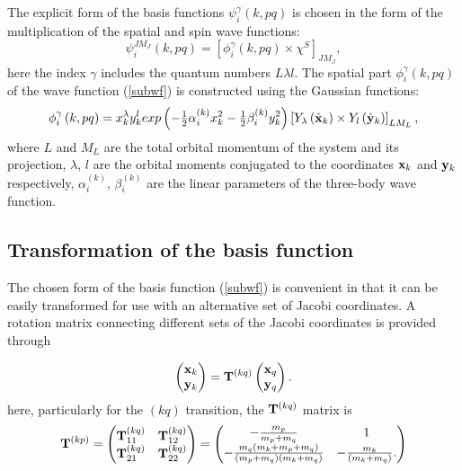 \documentclass[12pt,a4paper,twoside]{article}
\begin{document}
The explicit form of the basis functions $ \psi_{i}^{\gamma} \left(k, pq \right) $ is chosen in the form of the multiplication of the spatial and spin wave functions:
\begin{equation}
\psi_{i}^{JM_J}\left(k, pq \right) = \left[ \phi_{i}^{\gamma} \left(k, pq \right) 
\times \chi^{S} \right] _{JM_{J}},
\label{subwf}
\end{equation}
here the index $\gamma$ includes the quantum numbers $L \lambda l$. The spatial part $\phi_{i}^{\gamma} \left(k, pq \right) $ of the wave function (\ref {subwf}) is constructed using the Gaussian functions:
 \begin{equation}
 \phi_{i}^{\gamma} \left(k, pq \right) =
 x_{k}^{\lambda} y_{k}^{l} exp\left(- \tfrac{1}{2}\alpha^{(k)}_{i} x_{k}^{2} - \tfrac{1}{2} \beta^{(k)}_{i}  y_{k}^{2} \right) 
 \left[ Y_\lambda \left(  \hat{ \bf x}_k \right) \times Y_l \left( \hat{\bf y}_k \right) \right]_{LM_L},
 \label{radial_wf}
 \end{equation}
where $ L $ and $ M_L $ are the total orbital momentum of the system and its projection, $ \lambda $, $ l $ are the orbital moments conjugated to the coordinates $ {\bf x} _k $ and $ {\bf y} _k $ respectively, $ \alpha^{(k)} _ {i} $, $ \beta^{(k)}_{i}$ are the linear parameters of the three-body wave function.
 \subsection{Transformation of the basis function }
 The chosen form of the basis function (\ref{subwf}) is convenient in that it can be easily transformed for use with an alternative set of Jacobi coordinates. A rotation matrix connecting different sets of the Jacobi coordinates is provided through
 
\begin{equation}
\begin{pmatrix}
{\bf x}_k \\ 
{\bf y}_k
\end{pmatrix}  = {\bf T}^{(kq)}
\begin{pmatrix}
{\bf x}_q \\ 
{\bf y}_q
\end{pmatrix}.
\end{equation}
here, particularly for  the $(kq)$ transition, the ${\bf T}^{(kq)}$ matrix is 
\begin{equation}
{\bf T}^{(kp)} = 
 \begin{pmatrix}
 {\bf T}^{(kq)}_{11} & {\bf T}^{(kq)}_{12} \\
 {\bf T}^{(kq)}_{21}  &  {\bf T}^{(kq)}_{22}
 \end{pmatrix}
=
 \begin{pmatrix}
 -\tfrac{m_p}{m_p+m_q} & 1 \\
 -\tfrac{m_q(m_k+m_p+m_q)}{(m_p+m_q)(m_k+m_q)}  &  -\tfrac{m_k}{(m_k+m_q)}.
 \end{pmatrix}
\end{equation}
\end{document}
